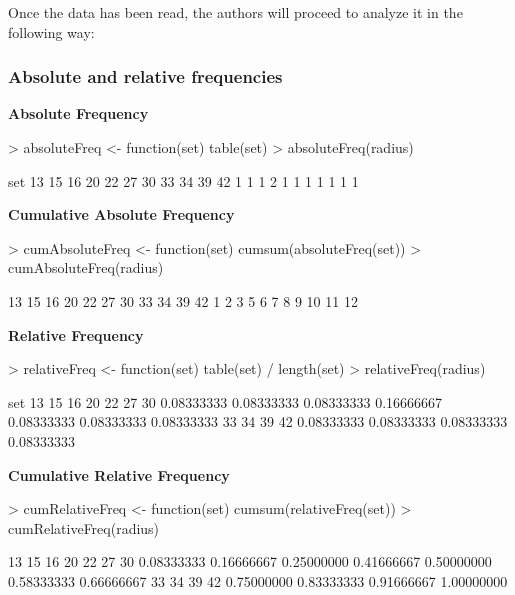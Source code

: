 \documentclass[a4paper]{article}
\begin{document}
Once the data has been read, the authors will proceed to analyze it in the
following way:


\subsubsection*{Absolute and relative frequencies}


\textbf{Absolute Frequency}

\begin{Schunk}
\begin{Sinput}
> absoluteFreq <- function(set) {table(set)}
> absoluteFreq(radius)
\end{Sinput}
\begin{Soutput}
set
13 15 16 20 22 27 30 33 34 39 42 
 1  1  1  2  1  1  1  1  1  1  1 
\end{Soutput}
\end{Schunk}


\textbf{Cumulative Absolute Frequency}

\begin{Schunk}
\begin{Sinput}
> cumAbsoluteFreq <- function(set) {cumsum(absoluteFreq(set))}
> cumAbsoluteFreq(radius)
\end{Sinput}
\begin{Soutput}
13 15 16 20 22 27 30 33 34 39 42 
 1  2  3  5  6  7  8  9 10 11 12 
\end{Soutput}
\end{Schunk}


\textbf{Relative Frequency}

\begin{Schunk}
\begin{Sinput}
> relativeFreq <- function(set) {table(set) / length(set)}
> relativeFreq(radius)
\end{Sinput}
\begin{Soutput}
set
        13         15         16         20         22         27         30 
0.08333333 0.08333333 0.08333333 0.16666667 0.08333333 0.08333333 0.08333333 
        33         34         39         42 
0.08333333 0.08333333 0.08333333 0.08333333 
\end{Soutput}
\end{Schunk}

\textbf{Cumulative Relative Frequency}
\begin{Schunk}
\begin{Sinput}
> cumRelativeFreq <- function(set) {cumsum(relativeFreq(set))}
> cumRelativeFreq(radius)
\end{Sinput}
\begin{Soutput}
        13         15         16         20         22         27         30 
0.08333333 0.16666667 0.25000000 0.41666667 0.50000000 0.58333333 0.66666667 
        33         34         39         42 
0.75000000 0.83333333 0.91666667 1.00000000 
\end{Soutput}
\end{Schunk}
\end{document}
